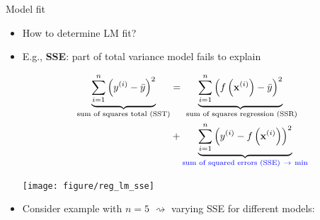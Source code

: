 \documentclass[11pt,compress,t,notes=noshow, xcolor=table]{beamer}
\begin{document}

\begin{frame}{Model fit}

\begin{itemize}
    \item How to determine LM fit?
    \item E.g., \textbf{SSE}: part of total 
    variance model fails to explain
    \begin{minipage}[b]{0.6\textwidth}
        \footnotesize
        \begin{align*}
            \underbrace{\sum\limits_{i=1}^n \left(y^{(i)} - \bar y\right)^2}_{\text{sum of 
            squares total (SST)}} &= 
            \underbrace{\sum\limits_{i=1}^n \left(f\left(\mathbf{x}^{(i)}\right) - \bar y\right)^2}_{\text{
            sum of squares regression (SSR)}} \\
            &+ \underbrace{\sum\limits_{i=1}^n \left(y^{(i)} - f\left(\mathbf{x}^{(i)}\right)\right)^2}_{\color{blue} 
            \text{sum of squared errors (SSE)} ~\rightarrow ~ \text{min}}
        \end{align*}
    \end{minipage}
    \begin{minipage}[b]{0.3\textwidth}
        \texttt{[image: figure/reg\_lm\_sse]}
    \end{minipage}
    \item Consider example with $n = 5$ $\rightsquigarrow$ varying SSE for 
    different models:
    \vfill
\end{itemize}

\end{frame}

\end{document}
